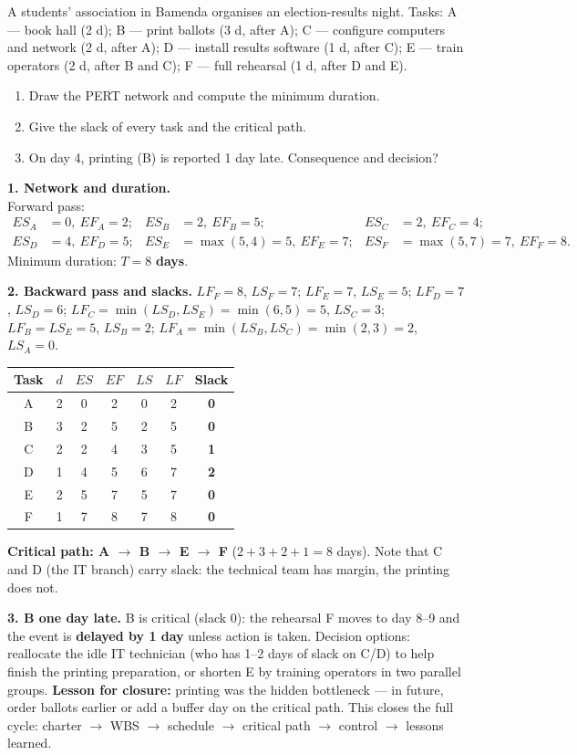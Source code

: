 \documentclass[11pt]{article}
\begin{document}
\begin{exoresolu}
A students' association in Bamenda organises an election-results night. Tasks: A — book hall (2 d); B — print ballots (3 d, after A); C — configure computers and network (2 d, after A); D — install results software (1 d, after C); E — train operators (2 d, after B and C); F — full rehearsal (1 d, after D and E).
\begin{enumerate}
\item Draw the PERT network and compute the minimum duration.
\item Give the slack of every task and the critical path.
\item On day 4, printing (B) is reported 1 day late. Consequence and decision?
\end{enumerate}
\tcblower
\textbf{1. Network and duration.}\\
Forward pass:
\begin{align*}
ES_A&=0,\ EF_A=2; & ES_B&=2,\ EF_B=5; & ES_C&=2,\ EF_C=4;\\
ES_D&=4,\ EF_D=5; & ES_E&=\max(5,4)=5,\ EF_E=7; & ES_F&=\max(5,7)=7,\ EF_F=8.
\end{align*}
Minimum duration: $T = 8$ \textbf{days}.

\textbf{2. Backward pass and slacks.} $LF_F = 8$, $LS_F = 7$; $LF_E = 7$, $LS_E = 5$; $LF_D = 7$, $LS_D = 6$; $LF_C = \min(LS_D, LS_E) = \min(6,5) = 5$, $LS_C = 3$; $LF_B = LS_E = 5$, $LS_B = 2$; $LF_A = \min(LS_B, LS_C) = \min(2,3) = 2$, $LS_A = 0$.
\begin{center}
\begin{tabular}{|c|c|c|c|c|c|c|}\hline
\rowcolor{popblueL} \textbf{Task} & $d$ & $ES$ & $EF$ & $LS$ & $LF$ & \textbf{Slack} \\ \hline
A & 2 & 0 & 2 & 0 & 2 & \textbf{0} \\ \hline
B & 3 & 2 & 5 & 2 & 5 & \textbf{0} \\ \hline
C & 2 & 2 & 4 & 3 & 5 & \textbf{1} \\ \hline
D & 1 & 4 & 5 & 6 & 7 & \textbf{2} \\ \hline
E & 2 & 5 & 7 & 5 & 7 & \textbf{0} \\ \hline
F & 1 & 7 & 8 & 7 & 8 & \textbf{0} \\ \hline
\end{tabular}
\end{center}
\textbf{Critical path: A $\to$ B $\to$ E $\to$ F} ($2+3+2+1 = 8$ days). Note that C and D (the IT branch) carry slack: the technical team has margin, the printing does not.

\textbf{3. B one day late.} B is critical (slack 0): the rehearsal F moves to day 8--9 and the event is \textbf{delayed by 1 day} unless action is taken. Decision options: reallocate the idle IT technician (who has 1--2 days of slack on C/D) to help finish the printing preparation, or shorten E by training operators in two parallel groups. \textbf{Lesson for closure:} printing was the hidden bottleneck — in future, order ballots earlier or add a buffer day on the critical path. This closes the full cycle: charter $\to$ WBS $\to$ schedule $\to$ critical path $\to$ control $\to$ lessons learned.
\end{exoresolu}
\end{document}
